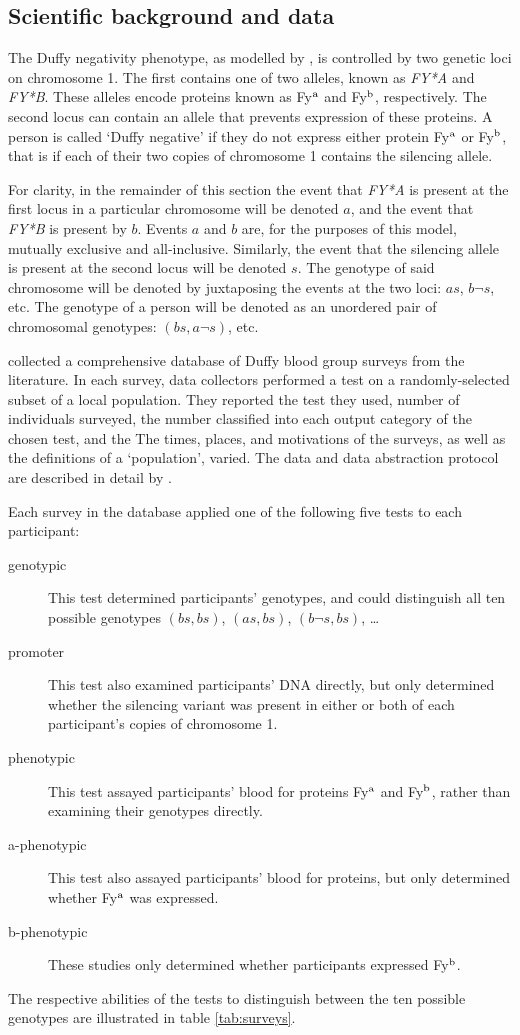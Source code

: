 \documentclass[article]{jss}
\begin{document}
\subsection{Scientific background and data}
\label{subsec:duffy-data} 
The Duffy negativity phenotype, as modelled by \cite{Howes}, is controlled by two genetic loci on chromosome 1. The first contains one of two alleles, known as \emph{FY*A} and \emph{FY*B}. These alleles encode proteins known as Fy$^\textup{a}$ and Fy$^\textup{b}$, respectively. The second locus can contain an allele that prevents expression of these proteins. A person is called `Duffy negative' if they do not express either protein Fy$^\textup{a}$ or Fy$^\textup{b}$, that is if each of their two copies of chromosome 1 contains the silencing allele. 

For clarity, in the remainder of this section the event that \emph{FY*A} is present at the first locus in a particular chromosome will be denoted $a$, and the event that \emph{FY*B} is present by $b$. Events $a$ and $b$ are, for the purposes of this model, mutually exclusive and all-inclusive. Similarly, the event that the silencing allele is present at the second locus will be denoted $s$. The genotype of said chromosome will be denoted by juxtaposing the events at the two loci: $as$, $b\neg s$, etc. The genotype of a person will be denoted as an unordered pair of chromosomal genotypes: $(bs,a \neg s)$, etc.

\cite{Howes} collected a comprehensive database of Duffy blood group surveys from the literature. In each survey, data collectors performed a test on a randomly-selected subset of a local population. They reported the test they used, number of individuals surveyed, the number classified into each output category of the chosen test, and the  The times, places, and motivations of the surveys, as well as the definitions of a `population', varied. The data and data abstraction protocol are described in detail by \cite{Howes}. 

Each survey in the database applied one of the following five tests to each participant:
\begin{description}
    \item[genotypic] This test determined participants' genotypes, and
could distinguish all ten possible genotypes $(bs,bs)$, $(as,bs)$, $(b\neg s,bs)$, \ldots
    \item[promoter] This test also examined participants' DNA directly, but only determined whether the silencing variant was present in either or both of each participant's copies of chromosome 1.
    \item[phenotypic] This test assayed participants' blood for proteins Fy$^\textup{a}$ and Fy$^\textup{b}$, rather than examining their genotypes directly.
    \item[a-phenotypic] This test also assayed participants' blood for proteins, but only determined whether Fy$^\textup{a}$ was expressed.
    \item[b-phenotypic] These studies only determined whether participants expressed Fy$^\textup{b}$.
\end{description}
The respective abilities of the tests to distinguish between the ten possible genotypes are illustrated in table \ref{tab:surveys}.
\end{document}
